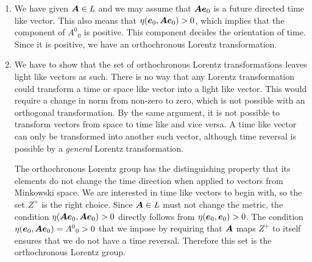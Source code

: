 \documentclass[11pt, english, fleqn, DIV=15, headinclude, BCOR=1cm]{scrartcl}
\begin{document}
\begin{enumerate}
    \item 
        We have given $\mat A \in L$ and we may assume that $\mat A \ev_0$ is a
        future directed time like vector. This also means that $\eta(\ev_0,
        \mat A \ev_0) > 0$, which implies that the component of $A^0{}_0$ is
        positive. This component decides the orientation of time. Since it is
        positive, we have an orthochronous Lorentz transformation.

    \item
        We have to show that the set of orthochronous Lorentz transformations
        leaves light like vectors as such. There is no way that any Lorentz
        transformation could transform a time or space like vector into a light
        like vector. This would require a change in norm from non-zero to zero,
        which is not possible with an orthogonal transformation. By the same
        argument, it is not possible to transform vectors from space to time
        like and vice versa. A time like vector can only be transformed into
        another such vector, although time reversal is possible by a
        \emph{general} Lorentz transformation.

        The orthochronous Lorentz group has the distinguishing property that
        its elements do not change the time direction when applied to vectors
        from Minkowski space. We are interested in time like vectors to begin
        with, so the set $Z^+$ is the right choice. Since $\mat A \in L$ must
        not change the metric, the condition $\eta(\mat A \ev_0, \mat A \ev_0)
        > 0$ directly follows from $\eta(\ev_0, \ev_0) > 0$. The condition
        $\eta(\ev_0, \mat A \ev_0) = A^0{}_0 > 0$ that we impose by requiring
        that $\mat A$ maps $Z^+$ to itself ensures that we do not have a time
        reversal. Therefore this set is the orthochronous Lorentz group.
\end{enumerate}
\end{document}

